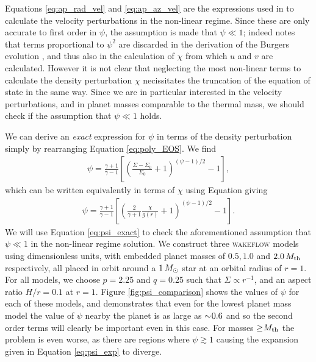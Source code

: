 Equations \ref{eq:ap_rad_vel} and \ref{eq:ap_az_vel} are the expressions used in \citet{bollati2021} to calculate the velocity perturbations in the non-linear regime. 
Since these are only accurate to first order in $\psi$, the assumption is made that $\psi \ll 1$; indeed \citet{bollati2021} notes that terms proportional to $\psi^2$ are discarded in the derivation of the Burgers evolution \feqr, and thus also in the calculation of $\chi$ from which $u$ and $v$ are calculated. 
However it is not clear that neglecting the most non-linear terms to calculate the density perturbation $\chi$ necissitates the truncation of the equation of state in the same way. 
Since we are in particular interested in the velocity perturbations, and in planet masses comparable to the thermal mass, we should check if the assumption that $\psi \ll 1$ holds.

We can derive an \textit{exact} expression for $\psi$ in terms of the density perturbation simply by rearranging Equation \ref{eq:poly_EOS}. We find
\begin{align}
    \psi = \frac{\gamma + 1}{\gamma - 1} \left[ \left( \frac{\Sigma-\Sigma_0}{\Sigma_0} +1  \right)^{(\psi-1)/2}  -1 \right],
\end{align}
which can be written equivalently in terms of $\chi$ using Equation \feqr giving
\begin{align}
    \psi = \frac{\gamma + 1}{\gamma - 1} \left[ \left( \frac{2}{\gamma + 1} \frac{\chi}{g(r)} +1  \right)^{(\psi-1)/2} -1 \right]. \label{eq:psi_exact}
\end{align}
We will use Equation \ref{eq:psi_exact} to check the aforementioned assumption that $\psi \ll 1$ in the non-linear regime solution. 
We construct three \textsc{wakeflow} models using dimensionless units, with embedded planet masses of $0.5, 1.0$ and $2.0 \, M_{\rm{th}}$ respectively, all placed in orbit around a $1 \, M_{\rm{\odot}}$ star at an orbital radius of $r=1$. 
For all models, we choose $p=2.25$ and $q=0.25$ such that $\Sigma \propto r^{-1}$, and an aspect ratio $H/r=0.1$ at $r=1$. 
Figure \ref{fig:psi_comparison} shows the values of $\psi$ for each of these models, and demonstrates that even for the lowest planet mass model the value of $\psi$ nearby the planet is as large as $\sim \hspace{-0.23em} 0.6$ and so the second order terms will clearly be important even in this case. 
For masses $\ge \hspace{-0.23em} M_\mathrm{th}$ the problem is even worse, as there are regions where $\psi \gtrsim 1$ causing the expansion given in Equation \ref{eq:psi_exp} to diverge.

